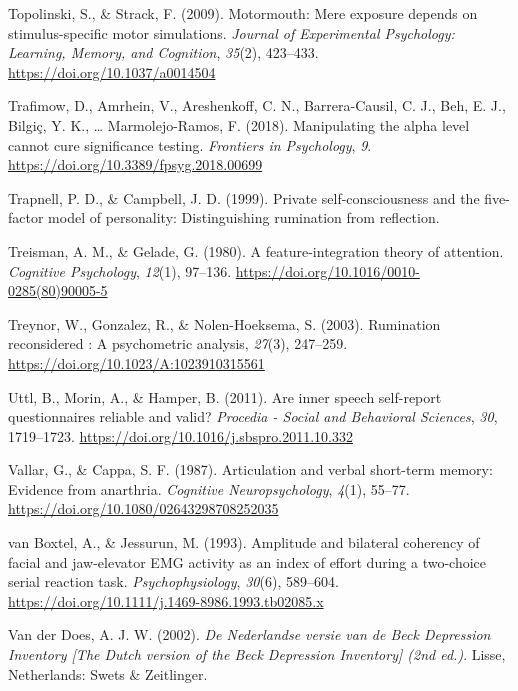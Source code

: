 \documentclass[a4paper,12pt,twoside,onecolumn,openright,final,oldfontcommands]{memoir}
\begin{document}
\leavevmode\hypertarget{ref-topolinski_motormouth_2009}{}%
Topolinski, S., \& Strack, F. (2009). Motormouth: Mere exposure depends on stimulus-specific motor simulations. \emph{Journal of Experimental Psychology: Learning, Memory, and Cognition}, \emph{35}(2), 423--433. \url{https://doi.org/10.1037/a0014504}

\leavevmode\hypertarget{ref-trafimow_manipulating_2018}{}%
Trafimow, D., Amrhein, V., Areshenkoff, C. N., Barrera-Causil, C. J., Beh, E. J., Bilgiç, Y. K., \ldots{} Marmolejo-Ramos, F. (2018). Manipulating the alpha level cannot cure significance testing. \emph{Frontiers in Psychology}, \emph{9}. \url{https://doi.org/10.3389/fpsyg.2018.00699}

\leavevmode\hypertarget{ref-trapnell_private_1999}{}%
Trapnell, P. D., \& Campbell, J. D. (1999). Private self-consciousness and the five-factor model of personality: Distinguishing rumination from reflection.

\leavevmode\hypertarget{ref-treisman_feature-integration_1980}{}%
Treisman, A. M., \& Gelade, G. (1980). A feature-integration theory of attention. \emph{Cognitive Psychology}, \emph{12}(1), 97--136. \url{https://doi.org/10.1016/0010-0285(80)90005-5}

\leavevmode\hypertarget{ref-treynor_rumination_2003}{}%
Treynor, W., Gonzalez, R., \& Nolen-Hoeksema, S. (2003). Rumination reconsidered : A psychometric analysis, \emph{27}(3), 247--259. \url{https://doi.org/10.1023/A:1023910315561}

\leavevmode\hypertarget{ref-Uttl2011}{}%
Uttl, B., Morin, A., \& Hamper, B. (2011). Are inner speech self-report questionnaires reliable and valid? \emph{Procedia - Social and Behavioral Sciences}, \emph{30}, 1719--1723. \url{https://doi.org/10.1016/j.sbspro.2011.10.332}

\leavevmode\hypertarget{ref-vallar_articulation_1987}{}%
Vallar, G., \& Cappa, S. F. (1987). Articulation and verbal short-term memory: Evidence from anarthria. \emph{Cognitive Neuropsychology}, \emph{4}(1), 55--77. \url{https://doi.org/10.1080/02643298708252035}

\leavevmode\hypertarget{ref-van_boxtel_amplitude_1993}{}%
van Boxtel, A., \& Jessurun, M. (1993). Amplitude and bilateral coherency of facial and jaw-elevator EMG activity as an index of effort during a two-choice serial reaction task. \emph{Psychophysiology}, \emph{30}(6), 589--604. \url{https://doi.org/10.1111/j.1469-8986.1993.tb02085.x}

\leavevmode\hypertarget{ref-van_der_does_nederlandse_2002}{}%
Van der Does, A. J. W. (2002). \emph{De Nederlandse versie van de Beck Depression Inventory {[}The Dutch version of the Beck Depression Inventory{]} (2nd ed.)}. Lisse, Netherlands: Swets \& Zeitlinger.
\end{document}
